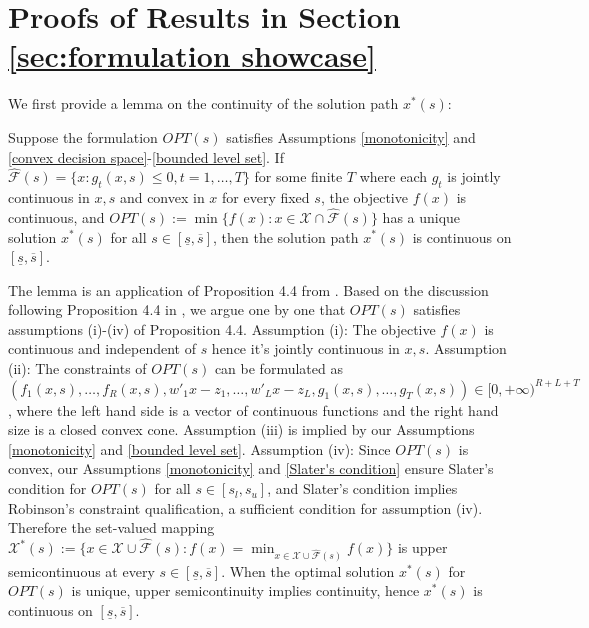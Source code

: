\documentclass[mnsc,blindrev]{informs4} %
\begin{document}
\section{Proofs of Results in Section \ref{sec:formulation showcase}}\label{sec:application proofs}
We first provide a lemma on the continuity of the solution path $x^*(s)$:
\begin{lemma}\label{continuity of solution path}
Suppose the formulation $OPT(s)$ satisfies Assumptions \ref{monotonicity} and \ref{convex decision space}-\ref{bounded level set}. If $\hat{\mathcal F}(s)=\{x:g_t(x,s)\leq 0,t=1,\ldots,T\}$ for some finite $T$ where each $g_t$ is jointly continuous in $x,s$ and convex in $x$ for every fixed $s$, the objective $f(x)$ is continuous, and $OPT(s):=\min\{f(x):x\in\mathcal X\cap \hat{\mathcal F}(s)\}$ has a unique solution $x^*(s)$ for all $s\in[\underline{s},\overline{s}]$, then the solution path $x^*(s)$ is continuous on $[\underline{s},\overline{s}]$.
\end{lemma}
The lemma is an application of Proposition 4.4 from \cite{bonnans2013perturbation}. Based on the discussion following Proposition 4.4 in \cite{bonnans2013perturbation}, we argue one by one that $OPT(s)$ satisfies assumptions (i)-(iv) of Proposition 4.4. Assumption (i): The objective $f(x)$ is continuous and independent of $s$ hence it's jointly continuous in $x,s$. Assumption (ii): The constraints of $OPT(s)$ can be formulated as $(f_1(x,s),\ldots,f_R(x,s),w'_1x-z_1,\ldots,w'_Lx-z_L,g_1(x,s),\ldots,g_T(x,s))\in [0,+\infty)^{R+L+T}$, where the left hand side is a vector of continuous functions and the right hand size is a closed convex cone. Assumption (iii) is implied by our Assumptions \ref{monotonicity} and \ref{bounded level set}. Assumption (iv): Since $OPT(s)$ is convex, our Assumptions \ref{monotonicity} and \ref{Slater's condition} ensure Slater's condition for $OPT(s)$ for all $s\in[s_l,s_u]$, and Slater's condition implies Robinson's constraint qualification, a sufficient condition for assumption (iv). Therefore the set-valued mapping $\mathcal X^*(s):=\{x\in \mathcal X\cup \hat{\mathcal F}(s):f(x)=\min_{x\in \mathcal X\cup \hat{\mathcal F}(s)}f(x)\}$ is upper semicontinuous at every $s\in [\underline{s},\overline{s}]$. When the optimal solution $x^*(s)$ for $OPT(s)$ is unique, upper semicontinuity implies continuity, hence $x^*(s)$ is continuous on $ [\underline{s},\overline{s}]$.\hfill\Halmos
\end{document}
